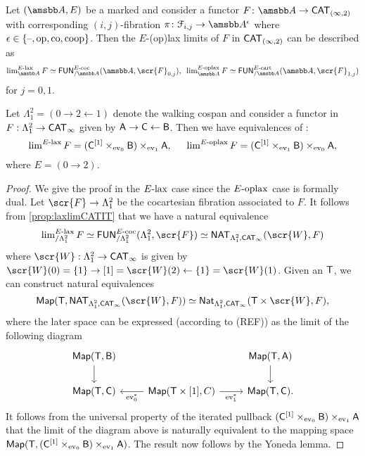 \documentclass[10pt,a4paper]{amsart}
\begin{document}
\begin{propn}\label{prop:laxlimCATIT}
  Let $(\tA,E)$ be a marked \itcat{} and consider a functor $F \colon\tc{A} \to \CATIT$ with corresponding  $(i,j)$-fibration  $\pi \colon\mathcal{F}_{i,j} \to \tc{A}^{\epsilon}$ where $\epsilon\in\{\text{\textendash},\text{\textup{op}},\text{\textup{co}},\text{\textup{coop}}\}$. Then the $E$-(op)lax limits of $F$ in $\textup{\textmd{\textsf{CAT}}}_{(\infty,2)}$ can be described as
  \[
    \lim^{\elax}_{\tc{A}}F \simeq \FUN^{E\dcoc}_{/\tc{A}}(\tc{A},\scr{F}_{0,j}), \enspace \lim^{\eoplax}_{\tc{A}}F \simeq \FUN^{E\dcart}_{/\tc{A}}(\tc{A},\scr{F}_{1,j})
  \]
  for $j = 0,1$.
\end{propn}

\begin{propn}\label{prop:arrow}
  Let $\Lambda^2_1=(0 \to 2 \leftarrow 1)$ denote the walking cospan and consider a functor in $F: \Lambda^2_1 \to \textup{\textmd{\textsf{CAT}}}_{\infty}$ given by $\mathsf{A} \to \mathsf{C} \leftarrow \mathsf{B}$. Then we have equivalences of \icats:
  \[
    \operatorname{lim}^{E\text{\textup{-lax}}}F = (\mathsf{C}^{[1]}\times_{\text{\textup{ev}}_0} \mathsf{B})\times_{\text{\textup{ev}}_1} \mathsf{A}, \enspace \enspace \enspace \operatorname{lim}^{E\text{\textup{-oplax}}}F = (\mathsf{C}^{[1]}\times_{\text{\textup{ev}}_1} \mathsf{B})\times_{\text{\textup{ev}}_0} \mathsf{A},
  \]
  where $E=(0 \to 2)$.
\end{propn}
\begin{proof}
  We give the proof in the $E\text{\textup{-lax}}$ case since the $E\text{\textup{-oplax}}$ case is formally dual. Let $\scr{F} \to \Lambda^2_1$ be the cocartesian fibration associated to $F$. It follows from \cref{prop:laxlimCATIT} that we have a natural equivalence 
  \[
      \lim^{\elax}_{/\Lambda^2_1}F \simeq \FUN^{E\dcoc}_{/\Lambda^2_1}(\Lambda^2_1,\scr{F}) \simeq \NAT_{\Lambda^2_1,\CATI}(\scr{W},F)
   \] 
   where $\scr{W}:\Lambda^2_1 \to \CATI$ is given by $\scr{W}(0)=\{1\} \to [1]=\scr{W}(2) \leftarrow \{1\}=\scr{W}(1)$. Given an \itcat{} $\mathsf{T}$, we can construct natural equivalences
   \[
     \Map(\oT,\NAT_{\Lambda^2_1,\CATI}(\scr{W},F))\simeq \Nat_{\Lambda^2_1,\CATI}(\oT \times \scr{W},F),
   \]
   where the later space can be expressed (according to (REF)) as the limit of the following diagram
   \[
     \begin{tikzcd}
       \Map(\oT,\oB) \arrow[d] & & \Map(\oT,\oA) \arrow[d] \\
       \Map(\oT,\oC)  & \arrow[l,"\ev^*_{0}"] \Map(\oT\times{[}1{]},C) \arrow[r,swap,"\ev^*_1"]& \Map(\oT,\oC).
     \end{tikzcd}
   \]
   It follows from the universal property of the iterated pullback $ (\mathsf{C}^{[1]}\times_{\text{\textup{ev}}_0} \mathsf{B})\times_{\text{\textup{ev}}_1} \mathsf{A}$ that the limit of the diagram above is naturally equivalent  to the mapping space $\textup{\textmd{\textsf{Map}}}(\mathsf{T}, (\mathsf{C}^{[1]}\times_{\text{\textup{ev}}_0} \mathsf{B})\times_{\text{\textup{ev}}_1} \mathsf{A})$. The result now follows by the Yoneda lemma.
\end{proof}
\end{document}
